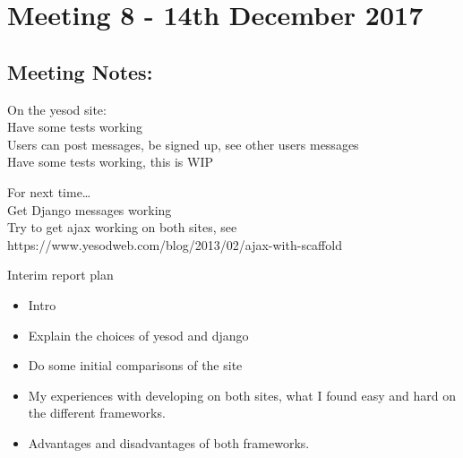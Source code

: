 \section{Meeting 8 - 14th December 2017}

\subsection{Meeting Notes:}
On the yesod site:\\
Have some tests working\\
Users can post messages, be signed up, see other users messages\\
Have some tests working, this is WIP

For next time…\\
Get Django messages working\\
Try to get ajax working on both sites, see https://www.yesodweb.com/blog/2013/02/ajax-with-scaffold

Interim report plan
\begin{itemize}
  \item Intro
  \item Explain the choices of yesod and django
  \item Do some initial comparisons of the site
  \item My experiences with developing on both sites, what I found easy and hard on the different frameworks.
  \item Advantages and disadvantages of both frameworks.
\end{itemize}

